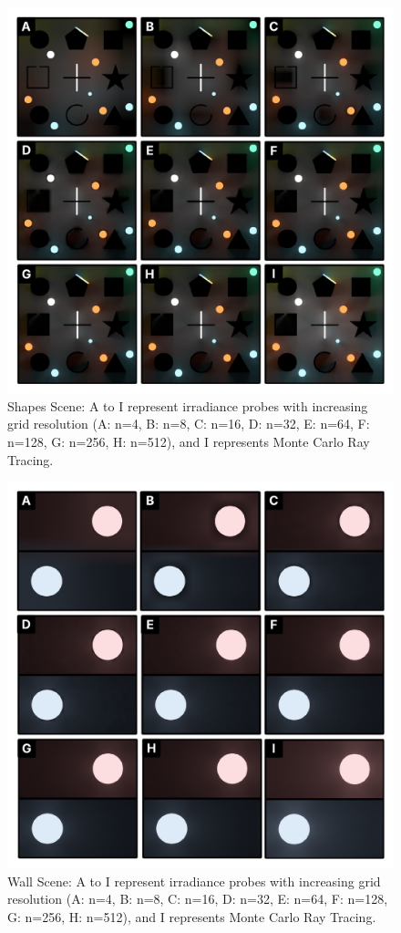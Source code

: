 \documentclass[acmtog, nonacm]{acmart}
\begin{document}
\begin{figure}[ht]
  \centering
    \includegraphics[width=0.9\linewidth]{shapes.pdf}
    \vspace{-10pt}
    \caption{Shapes Scene: A to I represent irradiance probes with increasing grid resolution (A: n=4, B: n=8, C: n=16, D: n=32, E: n=64, F: n=128, G: n=256, H: n=512), and I represents Monte Carlo Ray Tracing.}
\end{figure}

\vspace{-15pt}

\begin{figure}[ht]
  \centering
  \includegraphics[width=0.9\linewidth]{wall.pdf}
  \vspace{-10pt}
  \caption{Wall Scene: A to I represent irradiance probes with increasing grid resolution (A: n=4, B: n=8, C: n=16, D: n=32, E: n=64, F: n=128, G: n=256, H: n=512), and I represents Monte Carlo Ray Tracing.}
\end{figure}
\end{document}

